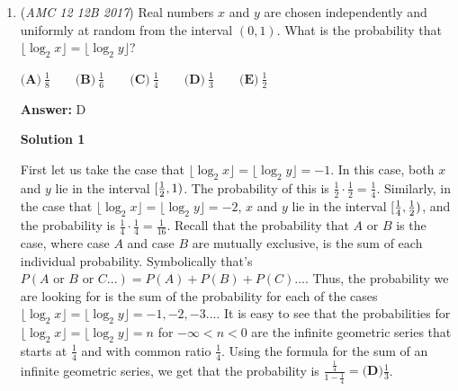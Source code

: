\begin{enumerate}
\textbf{Solution 5 (Solution 2 but more in-depth)}

The sum of all of the digits is just the sum of consecutive numbers from $1 -> 44$ or $\frac{44}{2}(45) = 990$. The prime factorization of $45$ is $3^2 * 5$. So if a number is divisible by $45$ it has to both be divisible by $9$ and $5$. The first number that satisfies this ends in $35$ because the ten's digit is one greater than the ten's digit in the consecutive numbers from $1$ to $44$, and the one's digit is one less than this number, and the number ends in a 5. The difference between $35$ and $44$ is $9$ giving $\boxed{\textbf{(C)}\,9}$.

 


	\item (\textit{AMC 12 12B 2017}) Real numbers $x$ and $y$ are chosen independently and uniformly at random from the interval $(0,1)$. What is the probability that $\lfloor\log_2x\rfloor=\lfloor\log_2y\rfloor$?


 $\textbf{(A)}\ \frac{1}{8}\qquad\textbf{(B)}\ \frac{1}{6}\qquad\textbf{(C)}\ \frac{1}{4}\qquad\textbf{(D)}\ \frac{1}{3}\qquad\textbf{(E)}\ \frac{1}{2}$

 \textbf{Answer: }D



\textbf{Solution 1}

First let us take the case that $\lfloor \log_2{x} \rfloor = \lfloor \log_2{y} \rfloor = -1$. In this case, both $x$ and $y$ lie in the interval $[{1\over2}, 1)$. The probability of this is $\frac{1}{2} \cdot \frac{1}{2} = \frac{1}{4}$. Similarly, in the case that $\lfloor \log_2{x} \rfloor = \lfloor \log_2{y} \rfloor = -2$, $x$ and $y$ lie in the interval $[{1\over4}, {1\over2})$, and the probability is $\frac{1}{4} \cdot \frac{1}{4} = \frac{1}{16}$. Recall that the probability that $A$ or $B$ is the case, where case $A$ and case $B$ are mutually exclusive, is the sum of each individual probability. Symbolically that's $P(A \text{ or } B \text{ or } C...) = P(A) + P(B) + P(C)...$. Thus, the probability we are looking for is the sum of the probability for each of the cases $\lfloor \log_2{x} \rfloor = \lfloor \log_2{y} \rfloor = -1, -2, -3...$. It is easy to see that the probabilities for $\lfloor \log_2{x} \rfloor = \lfloor \log_2{y} \rfloor = n$ for $-\infty < n < 0$ are the infinite geometric series that starts at $\frac{1}{4}$ and with common ratio $\frac{1}{4}$. Using the formula for the sum of an infinite geometric series, we get that the probability is $\frac{\frac{1}{4}}{1 - \frac{1}{4}} = \boxed{\textbf{(D)}\frac{1}{3}}$.


\end{enumerate}
